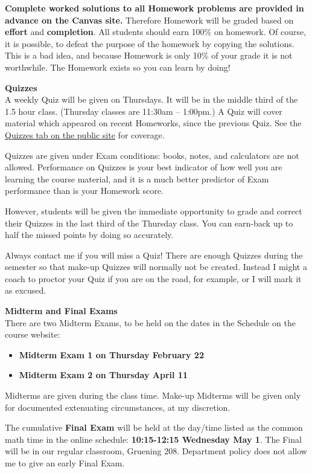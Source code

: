 \documentclass[12pt]{article}
\renewcommand{\emph}[1]{\textsf{\textbf{#1}}}
\newcommand{\localhead}[1]{\par\smallskip\textbf{#1} \smallskip\nobreak\\}%
\def\heading#1{\localhead{\large\emph{#1}}}
\begin{document}
\emph{Complete worked solutions to all Homework problems are provided in advance on the Canvas site.}  Therefore Homework will be graded based on \emph{effort} and \emph{completion}.  All students should earn 100\% on homework.  Of course, it is possible, to defeat the purpose of the homework by copying the solutions.  This is a bad idea, and because Homework is only 10\% of your grade it is not worthwhile.  The Homework exists so you can learn by doing!


\heading{Quizzes}
A weekly Quiz will be given on Thursdays.  It will be in the middle third of the 1.5 hour class.  (Thursday classes are 11:30am -- 1:00pm.)  A Quiz will cover material which appeared on recent Homeworks, since the previous Quiz.  See the \href{https://uaf-math251.github.io/calc2/quizzes.html}{Quizzes tab on the public site} for coverage.

Quizzes are given under Exam conditions: books, notes, and calculators are not allowed.  Performance on Quizzes is your best indicator of how well you are learning the course material, and it is a much better predictor of Exam performance than is your Homework score.

However, students will be given the immediate opportunity to grade and correct their Quizzes in the last third of the Thursday class.  You can earn-back up to half the missed points by doing so accurately.

Always contact me if you will miss a Quiz!  There are enough Quizzes during the semester so that make-up Quizzes will normally not be created.  Instead I might a coach to proctor your Quiz if you are on the road, for example, or I will mark it as excused. 


\heading{Midterm and Final Exams}
There are two Midterm Exams, to be held on the dates in the Schedule on the course website:
\begin{itemize}
\item \emph{Midterm Exam 1 on Thursday February 22}
\item \emph{Midterm Exam 2 on Thursday April 11}
\end{itemize}
Midterms are given during the class time.  Make-up Midterms will be given only for documented extenuating circumstances, at my discretion.

The cumulative \emph{Final Exam} will be held at the day/time listed as the common math time in the online schedule: \emph{10:15-12:15 Wednesday May 1}.  The Final will be in our regular classroom, Gruening 208.  Department policy does not allow me to give an early Final Exam.
\end{document}
